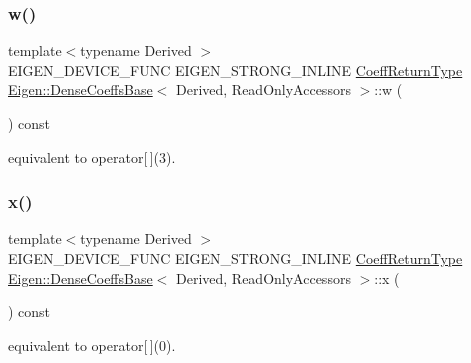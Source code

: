 \subsubsection{\texorpdfstring{w()}{w()}}
{\footnotesize\ttfamily template$<$typename Derived $>$ \\
E\+I\+G\+E\+N\+\_\+\+D\+E\+V\+I\+C\+E\+\_\+\+F\+U\+NC E\+I\+G\+E\+N\+\_\+\+S\+T\+R\+O\+N\+G\+\_\+\+I\+N\+L\+I\+NE \mbox{\hyperlink{struct_eigen_1_1internal_1_1true__type}{Coeff\+Return\+Type}} \mbox{\hyperlink{class_eigen_1_1_dense_coeffs_base}{Eigen\+::\+Dense\+Coeffs\+Base}}$<$ Derived, Read\+Only\+Accessors $>$\+::w (\begin{DoxyParamCaption}{ }\end{DoxyParamCaption}) const\hspace{0.3cm}{\ttfamily [inline]}}

equivalent to operator\mbox{[}$\,$\mbox{]}(3). \mbox{\label{class_eigen_1_1_dense_coeffs_base_3_01_derived_00_01_read_only_accessors_01_4_a36fb246141b6ea5ab5289d7eb6afdf6e}} 
\subsubsection{\texorpdfstring{x()}{x()}}
{\footnotesize\ttfamily template$<$typename Derived $>$ \\
E\+I\+G\+E\+N\+\_\+\+D\+E\+V\+I\+C\+E\+\_\+\+F\+U\+NC E\+I\+G\+E\+N\+\_\+\+S\+T\+R\+O\+N\+G\+\_\+\+I\+N\+L\+I\+NE \mbox{\hyperlink{struct_eigen_1_1internal_1_1true__type}{Coeff\+Return\+Type}} \mbox{\hyperlink{class_eigen_1_1_dense_coeffs_base}{Eigen\+::\+Dense\+Coeffs\+Base}}$<$ Derived, Read\+Only\+Accessors $>$\+::x (\begin{DoxyParamCaption}{ }\end{DoxyParamCaption}) const\hspace{0.3cm}{\ttfamily [inline]}}

equivalent to operator\mbox{[}$\,$\mbox{]}(0). \mbox{\label{class_eigen_1_1_dense_coeffs_base_3_01_derived_00_01_read_only_accessors_01_4_af2cb257225cf4348136a37fa9333ccda}} 
